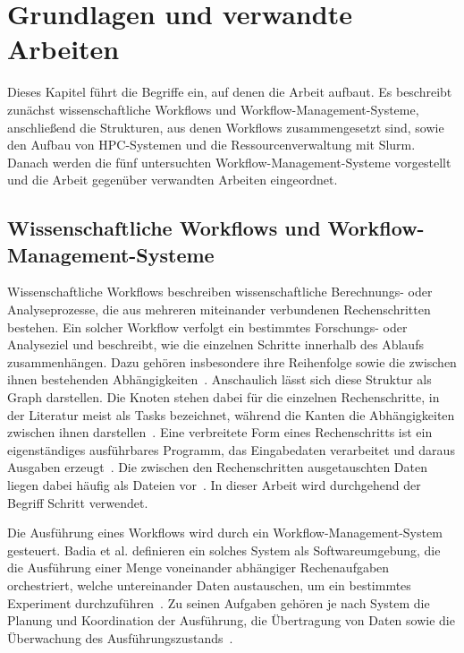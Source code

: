 
\chapter{Grundlagen und verwandte Arbeiten}
\label{sec:basics}

Dieses Kapitel führt die Begriffe ein, auf denen die Arbeit
aufbaut. Es beschreibt zunächst wissenschaftliche Workflows und
Workflow-Management-Systeme, anschließend die Strukturen, aus denen
Workflows zusammengesetzt sind, sowie den Aufbau von HPC-Systemen
und die Ressourcenverwaltung mit Slurm. Danach werden die fünf untersuchten Workflow-Management-Systeme
vorgestellt und die Arbeit gegenüber verwandten Arbeiten
eingeordnet.

\section{Wissenschaftliche Workflows und Workflow-Management-Systeme}
\label{sec:basics:wms}
Wissenschaftliche Workflows beschreiben wissenschaftliche
Berechnungs- oder Analyseprozesse, die aus mehreren miteinander
verbundenen Rechenschritten bestehen. Ein solcher Workflow verfolgt
ein bestimmtes Forschungs- oder Analyseziel und beschreibt, wie die
einzelnen Schritte innerhalb des Ablaufs zusammenhängen. Dazu
gehören insbesondere ihre Reihenfolge sowie die zwischen ihnen
bestehenden Abhängigkeiten~\cite[S.~2]{suter2026terminology}.
Anschaulich lässt sich diese Struktur als Graph darstellen. Die
Knoten stehen dabei für die einzelnen Rechenschritte, in der
Literatur meist als Tasks bezeichnet, während die Kanten die
Abhängigkeiten zwischen ihnen
darstellen~\cite[S.~28\,f.]{badia2017workflows}. Eine verbreitete
Form eines Rechenschritts ist ein eigenständiges ausführbares
Programm, das Eingabedaten verarbeitet und daraus Ausgaben
erzeugt~\cite[S.~4]{suter2026terminology}. Die zwischen den
Rechenschritten ausgetauschten Daten liegen dabei häufig als Dateien
vor~\cite[S.~29]{badia2017workflows}. In dieser
Arbeit wird durchgehend der Begriff Schritt verwendet.
 
Die Ausführung eines Workflows wird durch ein
Workflow-Management-System gesteuert. Badia et al. definieren ein
solches System als Softwareumgebung, die die Ausführung einer Menge
voneinander abhängiger Rechenaufgaben orchestriert, welche
untereinander Daten austauschen, um ein bestimmtes Experiment
durchzuführen~\cite[S.~28]{badia2017workflows}.
Zu seinen Aufgaben gehören je nach System die Planung und
Koordination der Ausführung, die Übertragung von Daten sowie die
Überwachung des Ausführungszustands~\cite[S.~29]{badia2017workflows}\cite[S.~2]{suter2026terminology}.

